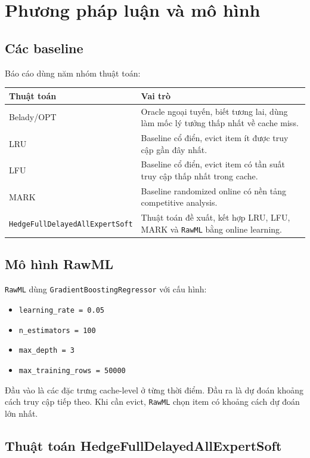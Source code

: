 \documentclass[11pt,a4paper]{article}
\newcommand{\code}[1]{\texttt{#1}}
\newcommand{\hedge}{\code{HedgeFullDelayedAllExpertSoft}}
\newcommand{\rawml}{\code{RawML}}
\begin{document}
\section{Phương pháp luận và mô hình}

\subsection{Các baseline}

Báo cáo dùng năm nhóm thuật toán:

\begin{tabularx}{\textwidth}{lX}
\toprule
Thuật toán & Vai trò \\
\midrule
Belady/OPT & Oracle ngoại tuyến, biết tương lai, dùng làm mốc lý tưởng thấp nhất về cache miss. \\
LRU & Baseline cổ điển, evict item ít được truy cập gần đây nhất. \\
LFU & Baseline cổ điển, evict item có tần suất truy cập thấp nhất trong cache. \\
MARK & Baseline randomized online có nền tảng competitive analysis. \\
\hedge{} & Thuật toán đề xuất, kết hợp LRU, LFU, MARK và \rawml{} bằng online learning. \\
\bottomrule
\end{tabularx}

\subsection{Mô hình RawML}

\rawml{} dùng \code{GradientBoostingRegressor} với cấu hình:

\begin{itemize}[leftmargin=1.4em]
    \item \code{learning\_rate = 0.05}
    \item \code{n\_estimators = 100}
    \item \code{max\_depth = 3}
    \item \code{max\_training\_rows = 50000}
\end{itemize}

Đầu vào là các đặc trưng cache-level ở từng thời điểm. Đầu ra là dự đoán khoảng cách truy cập tiếp theo. Khi cần evict, \rawml{} chọn item có khoảng cách dự đoán lớn nhất.

\subsection{Thuật toán HedgeFullDelayedAllExpertSoft}
\end{document}
